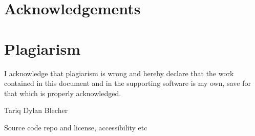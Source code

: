  
\chapter*{Acknowledgements}

\chapter*{Plagiarism}
 I acknowledge that plagiarism is wrong and hereby declare that the work contained in this document and in the supporting software is my own, save for that which is properly acknowledged.
 \vspace{55pt}
 
Tariq Dylan Blecher
 \clearpage
  \vspace*{\fill}
    \begin{center}
     \huge
     Source code repo and license, accessibility etc
    \end{center}
  \vspace*{\fill}
 \clearpage
{\let\clearpage\relax \tableofcontents \listoffigures \listoftables}